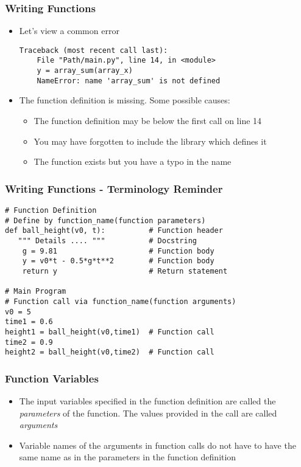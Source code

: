 \documentclass[english,14pt]{beamer}
\begin{document}
\begin{frame}[fragile]
\frametitle{Writing Functions}
\begin{itemize}
    \item Let's view a common error
    \begin{lstlisting}[style=pseudo]
    Traceback (most recent call last):
    File "Path/main.py", line 14, in <module>
    y = array_sum(array_x)
    NameError: name 'array_sum' is not defined
    \end{lstlisting}
    \item The function definition is missing. Some possible causes:
    \begin{itemize}
        \item The function definition may be below the first call on line 14
        \item You may have forgotten to include the library which defines it
        \item The function exists but you have a typo in the name 
    \end{itemize}
\end{itemize}
\end{frame}


\begin{frame}[fragile]
\frametitle{Writing Functions - Terminology Reminder}
\begin{lstlisting}[style=CStyle]
# Function Definition 
# Define by function_name(function parameters)  
def ball_height(v0, t):          # Function header
   """ Details .... """          # Docstring
    g = 9.81                     # Function body
    y = v0*t - 0.5*g*t**2        # Function body
    return y                     # Return statement
    
# Main Program
# Function call via function_name(function arguments)
v0 = 5                        
time1 = 0.6                       
height1 = ball_height(v0,time1)  # Function call  
time2 = 0.9
height2 = ball_height(v0,time2)  # Function call  
\end{lstlisting}
\end{frame}

\begin{frame}[fragile]
\frametitle{Function Variables}
\begin{itemize}
    \item The input variables specified in the function definition are called the \textit{parameters} of the function. The values provided in the call are called \textit{arguments}
    \item Variable names of the arguments in function calls do not have to have the same name as in the parameters in the function definition 
\end{itemize}
\end{frame}
\end{document}
